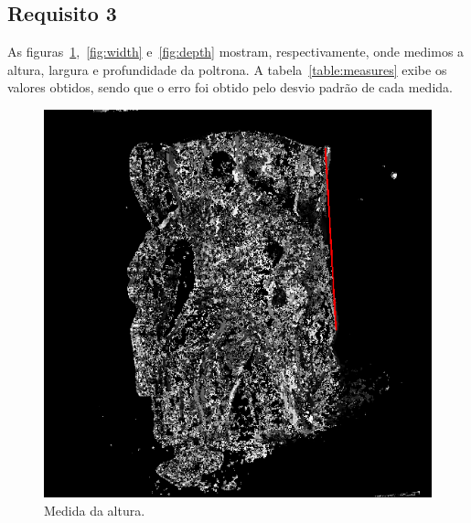 \documentclass{bmvc2k}
\begin{document}
\subsection{Requisito 3}
As figuras~\ref{fig:height},~\ref{fig:width} e~\ref{fig:depth} mostram, respectivamente, onde medimos a altura, largura e profundidade da poltrona. A tabela~\ref{table:measures} exibe os valores obtidos, sendo que o erro foi obtido pelo desvio padrão de cada medida.

\begin{figure}[htb]
\centering
\begin{minipage}[t]{0.25\textwidth}
  \centering
  \includegraphics[width=\linewidth]{figs/height.png}
  \caption{Medida da altura.}
  \label{fig:height}
\end{minipage}\hfill
\begin{minipage}[t]{0.25\textwidth}
  \centering

\end{minipage}
\end{figure}
\end{document}
